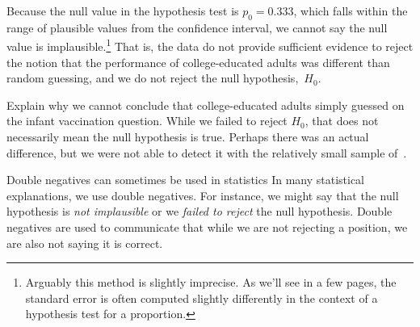 Because the null value in the hypothesis test is $p_0 = 0.333$,
which falls within the range of plausible values from the
confidence interval, we cannot say the null value is
implausible.\footnote{Arguably this method is slightly imprecise.
  As we'll see in a few pages, the standard error is often
  computed slightly differently in the context of a hypothesis
  test for a proportion.}
That is, the data do not provide sufficient evidence to reject
the notion that the performance of college-educated
adults was different than random guessing,
and we do not reject the null hypothesis,~$H_0$.

\begin{examplewrap}
\begin{nexample}{Explain why we cannot conclude that
    college-educated adults simply guessed on the
    infant vaccination question.}
  While we failed to reject $H_0$, that does not
  necessarily mean the null hypothesis is true.
  Perhaps there was an actual difference,
  but we were not able to detect it with the
  relatively small sample of~\roslingAsize{}.

\end{nexample}
\end{examplewrap}

\begin{onebox}{Double negatives can sometimes be used in statistics}
  In many statistical explanations, we use double negatives.
  For instance, we might say that the null hypothesis is
  \emph{not implausible} or we \emph{failed to reject}
  the null hypothesis.
  Double negatives are used to communicate that while we
  are not rejecting a position, we are also not saying it
  is correct.
\end{onebox}

